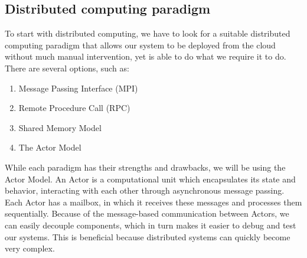 \documentclass[a4paper]{article}
\begin{document}
\subsection{Distributed computing paradigm}
\label{sec:distributedcomputingparadigm}
To start with distributed computing, we have to look for a suitable distributed computing paradigm that allows our system to be deployed from the cloud without much manual intervention, yet is able to do what we require it to do. There are several options, such as:
\begin{enumerate}
    \item Message Passing Interface (MPI)\cite{MPI}
    \item Remote Procedure Call (RPC)\cite{RPC}
    \item Shared Memory Model\cite{SMM}
    \item The Actor Model\cite{ActorModel}
\end{enumerate}
While each paradigm has their strengths and drawbacks, we will be using the Actor Model. An Actor is a computational unit which encapsulates its state and behavior, interacting with each other through asynchronous message passing. Each Actor has a mailbox, in which it receives these messages and processes them sequentially. Because of the message-based communication between Actors, we can easily decouple components, which in turn makes it easier to debug and test our systems. This is beneficial because distributed systems can quickly become very complex.
\end{document}
